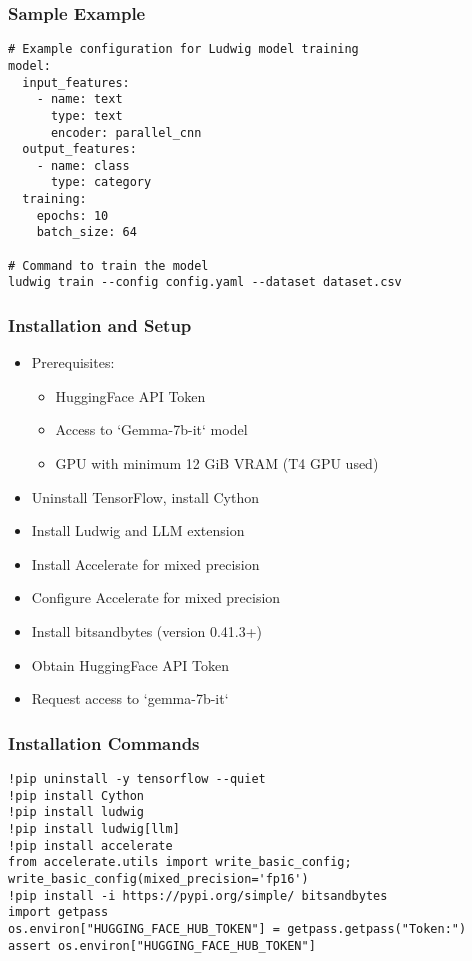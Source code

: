 \begin{frame}[fragile]\frametitle{Sample Example}
\begin{lstlisting}
# Example configuration for Ludwig model training
model:
  input_features:
    - name: text
      type: text
      encoder: parallel_cnn
  output_features:
    - name: class
      type: category
  training:
    epochs: 10
    batch_size: 64

# Command to train the model
ludwig train --config config.yaml --dataset dataset.csv
\end{lstlisting}
\end{frame}

\begin{frame}[fragile]\frametitle{Installation and Setup}
\begin{itemize}
\item Prerequisites:
    \begin{itemize}
    \item HuggingFace API Token
    \item Access to `Gemma-7b-it` model
    \item GPU with minimum 12 GiB VRAM (T4 GPU used)
    \end{itemize}
\item Uninstall TensorFlow, install Cython
\item Install Ludwig and LLM extension
\item Install Accelerate for mixed precision
\item Configure Accelerate for mixed precision
\item Install bitsandbytes (version 0.41.3+)
\item Obtain HuggingFace API Token
\item Request access to `gemma-7b-it`
\end{itemize}
\end{frame}

\begin{frame}[fragile]\frametitle{Installation Commands}
\begin{lstlisting}
!pip uninstall -y tensorflow --quiet
!pip install Cython
!pip install ludwig
!pip install ludwig[llm]
!pip install accelerate
from accelerate.utils import write_basic_config; write_basic_config(mixed_precision='fp16')
!pip install -i https://pypi.org/simple/ bitsandbytes
import getpass
os.environ["HUGGING_FACE_HUB_TOKEN"] = getpass.getpass("Token:")
assert os.environ["HUGGING_FACE_HUB_TOKEN"]
\end{lstlisting}
\end{frame}

